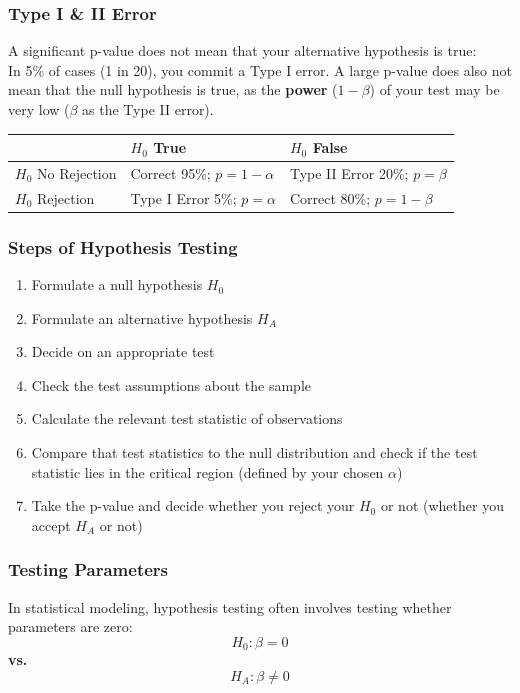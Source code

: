 \documentclass{beamer}
\begin{document}
\begin{frame}
\frametitle{Type I \& II Error}
\large
    A significant p-value does not mean that your alternative hypothesis is true:\\
    In 5\% of cases (1 in 20), you commit a Type I error.
    \vspace{0.3cm}
    A large p-value does also not mean that the null hypothesis is true, as the \textbf{power} ($1 - \beta$) of your test may be very low ($\beta$ as the Type II error).

    \small
    \begin{table}[]
    \begin{tabular}{|l|l|l|}
    \hline
    \textbf{} & \textbf{$H_0$ True} & \textbf{$H_0$ False} \\
    \hline
    $H_0$ No Rejection & Correct 95\%; $p = 1 - \alpha$ & Type II Error 20\%; $p = \beta$ \\
    $H_0$ Rejection & Type I Error 5\%; $p = \alpha$ & Correct 80\%; $p = 1 - \beta$\\
    \hline
    \end{tabular}
    \end{table}
\end{frame}

\begin{frame}
    \frametitle{Steps of Hypothesis Testing}
    \begin{enumerate}
        \item Formulate a null hypothesis $H_0$
        \item Formulate an alternative hypothesis $H_A$
        \item Decide on an appropriate test
        \item Check the test assumptions about the sample
        \item Calculate the relevant test statistic of observations
        \item Compare that test statistics to the null distribution and check if the test statistic lies in the critical region (defined by your chosen $\alpha$)
        \item Take the p-value and decide whether you reject your $H_0$ or not (whether you accept $H_A$ or not)
    \end{enumerate}
\end{frame}

\begin{frame}
    \frametitle{Testing Parameters}
    \Large
    In statistical modeling, hypothesis testing often involves testing whether parameters are zero:
    \centering
    \[
    H_0: \beta = 0
    \]
    \textbf{vs.}
    \[
    H_A: \beta \neq 0
    \]
\end{frame}
\end{document}
